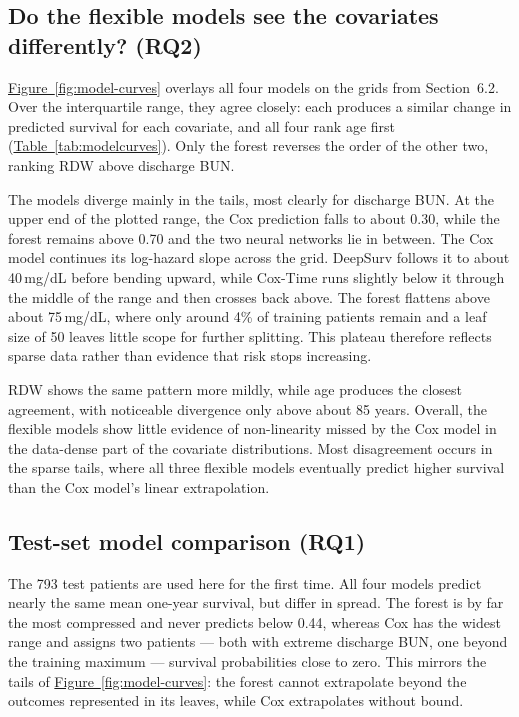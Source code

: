 \documentclass[11pt,a4paper]{article}
\newcommand{\tabref}[1]{\hyperref[#1]{Table~\ref*{#1}}}
\newcommand{\figref}[1]{\hyperref[#1]{Figure~\ref*{#1}}}
\begin{document}
\subsection{Do the flexible models see the covariates differently? (RQ2)}

\figref{fig:model-curves} overlays all four models on the grids from Section~6.2. Over the interquartile range, they agree closely: each produces a similar change in predicted survival for each covariate, and all four rank age first (\tabref{tab:modelcurves}). Only the forest reverses the order of the other two, ranking RDW above discharge BUN.

The models diverge mainly in the tails, most clearly for discharge BUN. At the upper end of the plotted range, the Cox prediction falls to about 0.30, while the forest remains above 0.70 and the two neural networks lie in between. The Cox model continues its log-hazard slope across the grid. DeepSurv follows it to about 40\,mg/dL before bending upward, while Cox-Time runs slightly below it through the middle of the range and then crosses back above. The forest flattens above about 75\,mg/dL, where only around 4\% of training patients remain and a leaf size of 50 leaves little scope for further splitting. This plateau therefore reflects sparse data rather than evidence that risk stops increasing.

RDW shows the same pattern more mildly, while age produces the closest agreement, with noticeable divergence only above about 85 years. Overall, the flexible models show little evidence of non-linearity missed by the Cox model in the data-dense part of the covariate distributions. Most disagreement occurs in the sparse tails, where all three flexible models eventually predict higher survival than the Cox model's linear extrapolation.




\subsection{Test-set model comparison (RQ1)}

The 793 test patients are used here for the first time. All four models predict nearly the same mean one-year survival, but differ in spread. The forest is by far the most compressed and never predicts below 0.44, whereas Cox has the widest range and assigns two patients --- both with extreme discharge BUN, one beyond the training maximum --- survival probabilities close to zero. This mirrors the tails of \figref{fig:model-curves}: the forest cannot extrapolate beyond the outcomes represented in its leaves, while Cox extrapolates without bound.
\end{document}
